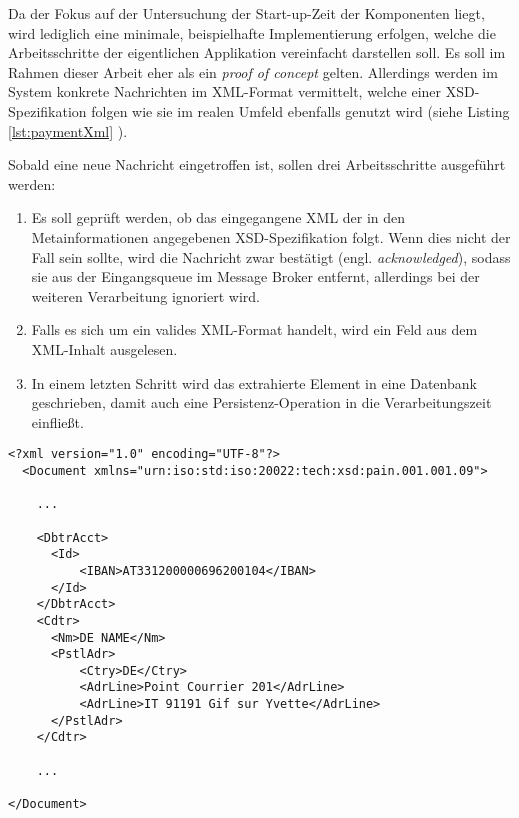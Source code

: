 Da der Fokus auf der Untersuchung der Start-up-Zeit der Komponenten liegt, wird lediglich eine minimale, beispielhafte Implementierung erfolgen, welche die Arbeitsschritte der eigentlichen Applikation vereinfacht darstellen soll. Es soll im Rahmen dieser Arbeit eher als ein \emph{proof of concept} gelten. Allerdings werden im System konkrete Nachrichten im XML-Format vermittelt, welche einer XSD-Spezifikation folgen wie sie im realen Umfeld ebenfalls genutzt wird (siehe Listing \ref{lst:paymentXml} ).

Sobald eine neue Nachricht eingetroffen ist, sollen drei Arbeitsschritte ausgeführt werden:

\begin{enumerate}

  \item Es soll geprüft werden, ob das eingegangene XML der in den Metainformationen angegebenen XSD-Spezifikation folgt. Wenn dies nicht der Fall sein sollte, wird die Nachricht zwar bestätigt (engl. \emph{acknowledged}), sodass sie aus der Eingangsqueue im Message Broker entfernt, allerdings bei der weiteren Verarbeitung ignoriert wird.

  \item Falls es sich um ein valides XML-Format handelt, wird ein Feld aus dem XML-Inhalt ausgelesen.

  \item In einem letzten Schritt wird das extrahierte Element in eine Datenbank geschrieben, damit auch eine Persistenz-Operation in die Verarbeitungszeit einfließt.

\end{enumerate}

\newpage

\begin{lstlisting}[style=xmlStyle,caption={Payment Format},label=lst:paymentXml]
  <?xml version="1.0" encoding="UTF-8"?>
  <Document xmlns="urn:iso:std:iso:20022:tech:xsd:pain.001.001.09">

    ...

    <DbtrAcct>
      <Id>
          <IBAN>AT331200000696200104</IBAN>
      </Id>
    </DbtrAcct>
    <Cdtr>
      <Nm>DE NAME</Nm>
      <PstlAdr>
          <Ctry>DE</Ctry>
          <AdrLine>Point Courrier 201</AdrLine>
          <AdrLine>IT 91191 Gif sur Yvette</AdrLine>
      </PstlAdr>
    </Cdtr>

    ... 

</Document>
\end{lstlisting}


